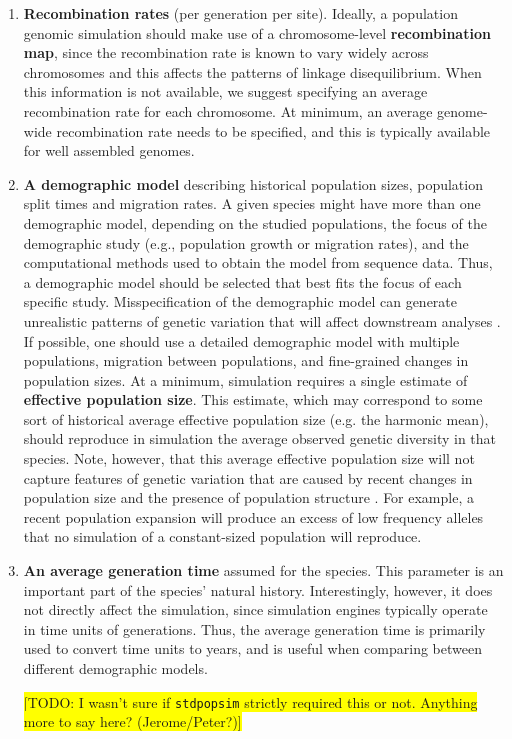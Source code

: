 \documentclass[hidelinks]{article}
\newcommand{\stdpopsim}{\texttt{stdpopsim}\xspace}
\begin{document}
\begin{enumerate}
\item
  \textbf{Recombination rates} (per generation per site).
  Ideally, a population genomic simulation should make use of a chromosome-level \textbf{recombination map}, since the recombination rate is known to vary widely across chromosomes and this affects the patterns of linkage disequilibrium. When this information is not available, we suggest specifying an average recombination rate for each chromosome.
  At minimum, an average genome-wide recombination rate needs to be specified, and this is typically available for well assembled genomes.

\item
  \textbf{A demographic model} describing historical population sizes, population split times and migration rates. A given species might have more than one demographic model, depending on the studied populations, the focus of the demographic study (e.g., population growth or migration rates), and the computational methods used to obtain the model from sequence data. Thus, a demographic model should be selected that best fits the focus of each specific study. Misspecification of the demographic model can generate unrealistic patterns of genetic variation that will affect downstream analyses \citep[e.g.,][]{Navascues2009}. If possible, one should use a detailed demographic model with multiple populations, migration between populations, and fine-grained changes in population sizes. At a minimum, simulation requires a single estimate of \textbf{effective population size}. This estimate, which may correspond to some sort of historical average effective population size (e.g. the harmonic mean), should reproduce in simulation the average observed genetic diversity in that species. Note, however, that this average effective population size will not capture features of genetic variation that are caused by recent changes in population size and the presence of population structure \citep{MacLeod2013}. For example, a recent population expansion will produce
  an excess of low frequency alleles that no simulation of a constant-sized
  population will reproduce.

\item
  \textbf{An average generation time} assumed for the species.
  This parameter is an important part of the species' natural history.
  Interestingly, however, it does not directly affect the simulation, since
  simulation engines typically operate in time units of generations. Thus, the average generation time is primarily used to convert time units to years, and is useful when comparing between different demographic models.

  \colorbox{yellow}{[TODO: I wasn't sure if \stdpopsim strictly required this or not. Anything more to say here? (Jerome/Peter?)]}

\end{enumerate}
\end{document}
